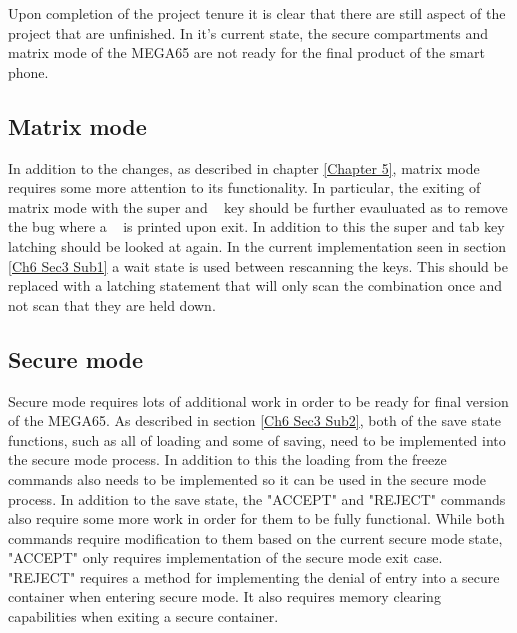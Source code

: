 \label{Ch7 Sec4}

Upon completion of the project tenure it is clear that there are still aspect of the project that are unfinished. In it's current state, the secure compartments and matrix mode of the MEGA65 are not ready for the final product of the smart phone.

\subsection{Matrix mode}

\label{Ch7 Sec4 Sub1}

In addition to the changes, as described in chapter \ref{Chapter 5}, matrix mode requires some more attention to its functionality. In particular, the exiting of matrix mode with the super and ~ key should be further evauluated as to remove the bug where a ~ is printed upon exit. In addition to this the super and tab key latching should be looked at again. In the current implementation seen in section \ref{Ch6 Sec3 Sub1} a wait state is used between rescanning the keys. This should be replaced with a latching statement that will only scan the combination once and not scan that they are held down.

\subsection{Secure mode}

\label{Ch7 Sec4 Sub2}

Secure mode requires lots of additional work in order to be ready for final version of the MEGA65. As described in section \ref{Ch6 Sec3 Sub2}, both of the save state functions, such as all of loading and some of saving, need to be implemented into the secure mode process. In addition to this the loading from the freeze commands also needs to be implemented so it can be used in the secure mode process. In addition to the save state, the "ACCEPT" and "REJECT" commands also require some more work in order for them to be fully functional. While both commands require modification to them based on the current secure mode state, "ACCEPT" only requires implementation of the secure mode exit case. "REJECT" requires a method for implementing the denial of entry into a secure container when entering secure mode. It also requires memory clearing capabilities when exiting a secure container.
